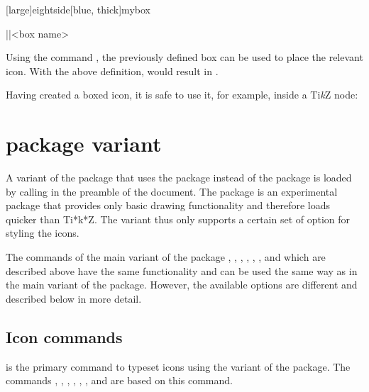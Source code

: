 \documentclass[a4paper]{article}
\let\die\undefined
\let\ability\undefined
\begin{document}
[large]{eightside}[blue, thick]{mybox}

\begin{macrodef}|\useprotecteddndicon|{<box name>}\end{macrodef}
Using the command \macro{\useprotecteddndicon}, the previously defined box can be used to place the relevant icon. With the above definition,  would result in .

Having created a boxed icon, it is safe to use it, for example, inside a Ti\emph{k}Z node:

\begin{codeexample}
\end{codeexample}

\section[l3draw package variant]{ package variant}

A variant of the package that uses the  package instead of the  package is loaded by calling \macro{\usepackage{dndicons-l3draw}} in the preamble of the document. The  package is an experimental package that provides only basic drawing functionality and therefore loads quicker than Ti*k*Z. The  variant thus only supports a certain set of option for styling the icons. 

The commands of the main variant of the package \macro{\die}, \macro{\ability}, \macro{\saving}, \macro{\spell}, \macro{\spellschool}, \macro{\damage}, \macro{\attack} and \macro{\condition} which are described above have the same functionality and can be used the same way as in the main variant of the package. However, the available options are different and described below in more detail.

\subsection{Icon commands}

\begin{macrodef}
\end{macrodef}
\macro{\DndIconsUseIcon} is the primary command to typeset icons using the  variant of the package. The commands \macro{\die}, \macro{\ability}, \macro{\saving}, \macro{\spell}, \macro{\spellschool}, \macro{\damage}, \macro{\attack} and \macro{\condition} are based on this command. 
\end{document}

